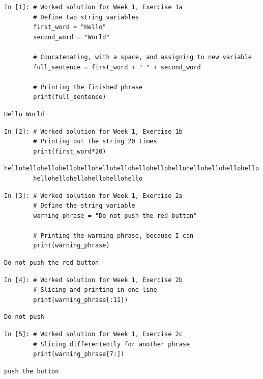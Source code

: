 \begin{lstlisting}[style=PY] 
In [1]: # Worked solution for Week 1, Exercise 1a
        # Define two string variables
        first_word = "Hello"
        second_word = "World"
        
        # Concatenating, with a space, and assigning to new variable
        full_sentence = first_word + " " + second_word
        
        # Printing the finished phrase
        print(full_sentence)
\end{lstlisting}

\begin{lstlisting}[style=PY_out] 
        Hello World
\end{lstlisting}

\begin{lstlisting}[style=PY] 
In [2]: # Worked solution for Week 1, Exercise 1b
        # Printing out the string 20 times
        print(first_word*20)
\end{lstlisting}
\begin{lstlisting}[style=PY_out] 
        hellohellohellohellohellohellohellohellohellohellohellohellohellohello
        hellohellohellohellohellohello
\end{lstlisting}

\begin{lstlisting}[style=PY] 
In [3]: # Worked solution for Week 1, Exercise 2a
        # Define the string variable
        warning_phrase = "Do not push the red button"
        
        # Printing the warning phrase, because I can
        print(warning_phrase)
\end{lstlisting}
\begin{lstlisting}[style=PY_out] 
        Do not push the red button
\end{lstlisting}

\begin{lstlisting}[style=PY] 
In [4]: # Worked solution for Week 1, Exercise 2b
        # Slicing and printing in one line
        print(warning_phrase[:11])
\end{lstlisting}
\begin{lstlisting}[style=PY_out] 
        Do not push
\end{lstlisting}

\begin{lstlisting}[style=PY] 
In [5]: # Worked solution for Week 1, Exercise 2c
        # Slicing differentently for another phrase
        print(warning_phrase[7:])
\end{lstlisting}
\begin{lstlisting}[style=PY_out] 
        push the button
\end{lstlisting}
